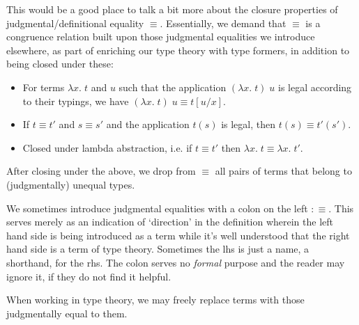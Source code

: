 \documentclass[12pt]{report}
\theoremstyle{definition}
\begin{document}
\begin{itemize}
	This would be a good place to talk a bit more about the closure properties of judgmental/definitional equality $\equiv$. 
	Essentially, we demand that $\equiv$ is a congruence relation built upon those judgmental equalities we introduce elsewhere, as part of enriching our type theory with type formers, in addition to being closed under these:
	\begin{itemize}
	\item For terms $\lambda x.\;t$ and $u$ such that the application $(\lambda x.\;t)\;u$ is legal according to their typings, we have $(\lambda x.\;t)\;u \equiv t[u/x]$. 
	\item If $t \equiv t'$ and $s \equiv s'$ and the application $t(s)$ is legal, then $t(s) \equiv t'(s')$. 
	\item Closed under lambda abstraction, i.e. if $t \equiv t'$ then $\lambda x.\;t \equiv \lambda x.\;t'$. 
	\end{itemize}
	After closing under the above, we drop from $\equiv$ all pairs of terms that belong to (judgmentally) unequal types. 

	We sometimes introduce judgmental equalities with a colon on the left $:\equiv$. 
	This serves merely as an indication of `direction' in the definition wherein the left hand side is being introduced as a term while it's well understood that the right hand side is a term of type theory. 
	Sometimes the lhs is just a name, a shorthand, for the rhs. 
	The colon serves no \textit{formal} purpose and the reader may ignore it, if they do not find it helpful. 

	When working in type theory, we may freely replace terms with those judgmentally equal to them.

\end{itemize}
\end{document}
